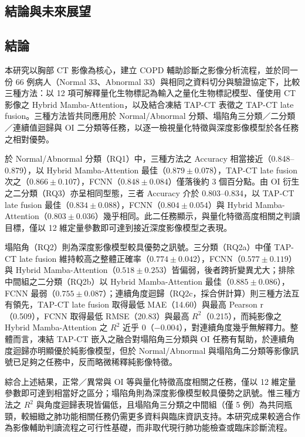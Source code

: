 \begin{ZhChapter}

\chapter{結論與未來展望}

\section{結論}

本研究以胸部 CT 影像為核心，建立 COPD 輔助診斷之影像分析流程，並於同一份 66 例病人（Normal 33、Abnormal 33）與相同之資料切分與驗證協定下，比較三種方法：以 12 項可解釋量化生物標記為輸入之量化生物標記模型、僅使用 CT 影像之 Hybrid Mamba-Attention，以及結合凍結 TAP-CT 表徵之 TAP-CT late fusion。三種方法皆共同應用於 Normal/Abnormal 分類、塌陷角三分類／二分類／連續值迴歸與 OI 二分類等任務，以逐一檢視量化特徵與深度影像模型於各任務之相對優勢。

於 Normal/Abnormal 分類（RQ1）中，三種方法之 Accuracy 相當接近（0.848--0.879），以 Hybrid Mamba-Attention 最佳（\(0.879 \pm 0.078\)），TAP-CT late fusion 次之（\(0.866 \pm 0.107\)），FCNN（\(0.848 \pm 0.084\)）僅落後約 3 個百分點。由 OI 衍生之二分類（RQ3）亦呈相同型態，三者 Accuracy 介於 0.803--0.834，以 TAP-CT late fusion 最佳（\(0.834 \pm 0.088\)），FCNN（\(0.804 \pm 0.054\)）與 Hybrid Mamba-Attention（\(0.803 \pm 0.036\)）幾乎相同。此二任務顯示，與量化特徵高度相關之判讀目標，僅以 12 維定量參數即可達到接近深度影像模型之表現。

塌陷角（RQ2）則為深度影像模型較具優勢之訊號。三分類（RQ2a）中僅 TAP-CT late fusion 維持較高之整體正確率（\(0.774 \pm 0.042\)），FCNN（\(0.577 \pm 0.119\)）與 Hybrid Mamba-Attention（\(0.518 \pm 0.253\)）皆偏弱，後者跨折變異尤大；排除中間組之二分類（RQ2b）以 Hybrid Mamba-Attention 最佳（\(0.885 \pm 0.086\)），FCNN 最弱（\(0.755 \pm 0.087\)）；連續角度迴歸（RQ2c，採合併計算）則三種方法互有領先，TAP-CT late fusion 取得最低 MAE（14.60）與最高 Pearson r（0.509），FCNN 取得最低 RMSE（20.83）與最高 \(R^2\)（0.215），而純影像之 Hybrid Mamba-Attention 之 \(R^2\) 近乎 0（\(-0.004\)），對連續角度幾乎無解釋力。整體而言，凍結 TAP-CT 嵌入之融合對塌陷角三分類與 OI 任務有幫助，於連續角度迴歸亦明顯優於純影像模型，但於 Normal/Abnormal 與塌陷角二分類等影像訊號已足夠之任務中，反而略微稀釋純影像特徵。

綜合上述結果，正常／異常與 OI 等與量化特徵高度相關之任務，僅以 12 維定量參數即可達到相當好之區分；塌陷角則為深度影像模型較具優勢之訊號。惟三種方法之 \(R^2\) 與角度迴歸表現皆偏低，且塌陷角三分類之中間組（僅 5 例）為共同瓶頸，較細緻之肺功能相關任務仍需更多資料與臨床資訊支持。本研究成果較適合作為影像輔助判讀流程之可行性基礎，而非取代現行肺功能檢查或臨床診斷流程。


\end{ZhChapter}
